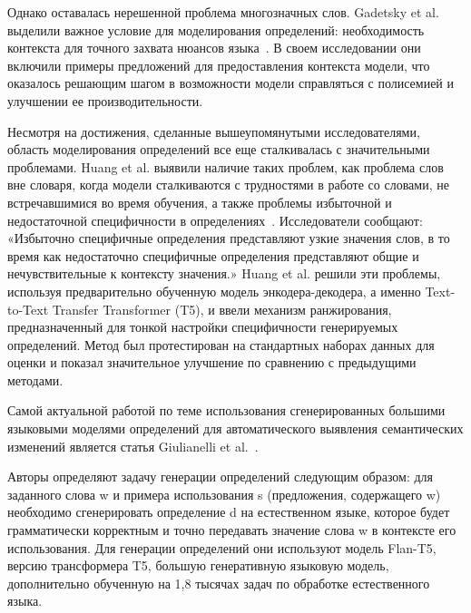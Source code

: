 \documentclass[LI,VKR]{HSEUniversity}
\begin{document}
Однако оставалась нерешенной проблема многозначных слов.
Gadetsky et al. выделили важное условие для моделирования определений:
необходимость контекста для точного захвата нюансов языка~\cite{gadetsky-etal-2018-conditional}.
В своем исследовании они включили примеры предложений для предоставления контекста модели,
что оказалось решающим шагом в возможности модели справляться с полисемией и улучшении
ее производительности.

Несмотря на достижения, сделанные вышеупомянутыми исследователями,
область моделирования определений все еще сталкивалась с значительными проблемами.
Huang et al. выявили наличие таких проблем,
как проблема слов вне словаря, когда модели сталкиваются с трудностями в работе со словами,
не встречавшимися во время обучения, а также проблемы избыточной и недостаточной
специфичности в определениях~\cite{huang-etal-2021-definition}.
Исследователи сообщают: «Избыточно специфичные определения представляют узкие значения слов,
в то время как недостаточно специфичные определения представляют общие и
нечувствительные к контексту значения.»
Huang et al. решили эти проблемы,
используя предварительно обученную модель энкодера-декодера,
а именно Text-to-Text Transfer Transformer (T5),
и ввели механизм ранжирования, предназначенный для тонкой настройки специфичности
генерируемых определений.
Метод был протестирован на стандартных наборах данных для оценки и показал значительное
улучшение по сравнению с предыдущими методами.

Самой актуальной работой по теме использования сгенерированных большими языковыми моделями
определений для автоматического выявления семантических изменений является статья
Giulianelli et al.~\cite{DefinitionGenerationMainArticle}.

Авторы определяют задачу генерации определений следующим образом: для заданного слова w и примера
использования s (предложения, содержащего w) необходимо сгенерировать определение d на
естественном языке, которое будет грамматически корректным и точно передавать значение слова
w в контексте его использования.
Для генерации определений они используют модель Flan-T5, версию трансформера T5,
большую генеративную языковую модель,
дополнительно обученную на 1,8 тысячах задач по обработке естественного языка.

\end{document}
